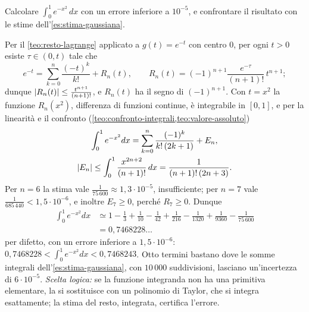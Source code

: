 \begin{esercizio}\label{es:integrale-gauss-taylor}
Calcolare $\int_{0}^{1}e^{-x^{2}}\,dx$ con un errore inferiore a $10^{-5}$, e confrontare il risultato
con le stime dell'\cref{es:stima-gaussiana}.
\begin{soluzione}
Per il \cref{teo:resto-lagrange} applicato a $g(t)=e^{-t}$ con centro $0$, per ogni $t>0$
esiste $\tau\in(0,t)$ tale che
\[
  e^{-t}=\sum_{k=0}^{n}\frac{(-t)^{k}}{k!}+R_{n}(t), \qquad R_{n}(t)=(-1)^{n+1}\frac{e^{-\tau}}{(n+1)!}\,t^{n+1} ;
\]
dunque $\lvert R_{n}(t)\rvert\le\frac{t^{n+1}}{(n+1)!}$, e $R_{n}(t)$ ha il segno di $(-1)^{n+1}$. Con $t=x^{2}$ la
funzione $R_{n}(x^{2})$, differenza di funzioni continue, è integrabile in $[0,1]$, e per
la linearità e il confronto (\cref{teo:confronto-integrali,teo:valore-assoluto})
\[
\begin{gathered}
  \int_{0}^{1}e^{-x^{2}}dx=\sum_{k=0}^{n}\frac{(-1)^{k}}{k!\,(2k+1)}+E_{n},\\
  \lvert E_{n}\rvert\le\int_{0}^{1}\frac{x^{2n+2}}{(n+1)!}\,dx=\frac1{(n+1)!\,(2n+3)} .
\end{gathered}
\]
Per $n=6$ la stima vale $\frac1{75\,600}\approx1{,}3\cdot10^{-5}$, insufficiente; per $n=7$ vale
$\frac1{685\,440}<1{,}5\cdot10^{-6}$, e inoltre $E_{7}\ge0$, perché $R_{7}\ge0$. Dunque
\[
\begin{aligned}
  \int_{0}^{1}e^{-x^{2}}dx&\simeq1-\frac13+\frac1{10}-\frac1{42}+\frac1{216}-\frac1{1320}
  +\frac1{9360}-\frac1{75\,600}\\
  &=0{,}7468228\ldots
\end{aligned}
\]
per difetto, con un errore inferiore a $1{,}5\cdot10^{-6}$: $0{,}7468228<\int_{0}^{1}e^{-x^{2}}dx<0{,}7468243$.
Otto termini bastano dove le somme integrali dell'\cref{es:stima-gaussiana}, con
$10\,000$ suddivisioni, lasciano un'incertezza di $6\cdot10^{-5}$. \emph{Scelta logica:} se la
funzione integranda non ha una primitiva elementare, la si sostituisce con un polinomio
di Taylor, che si integra esattamente; la stima del resto, integrata, certifica
l'errore.
\end{soluzione}
\end{esercizio}

